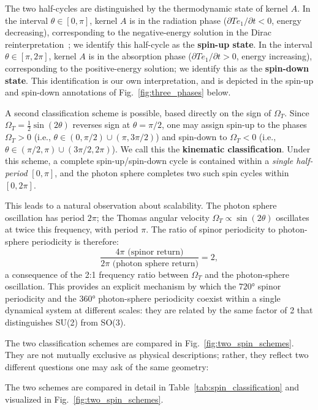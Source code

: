 \documentclass[%
 reprint,
 amsmath,amssymb,
 aps,
 prb,
]{revtex4-2}
\numberwithin{equation}{section}
\theoremstyle{definition}
\theoremstyle{remark}
\begin{document}
The two half-cycles are distinguished by the thermodynamic state of kernel $A$. In the interval $\theta \in [0, \pi]$, kernel $A$ is in the radiation phase ($\partial Te_1/\partial t < 0$, energy decreasing), corresponding to the negative-energy solution in the Dirac reinterpretation~\cite{Hanamura_2018_01}; we identify this half-cycle as the \textbf{spin-up state}. In the interval $\theta \in [\pi, 2\pi]$, kernel $A$ is in the absorption phase ($\partial Te_1/\partial t > 0$, energy increasing), corresponding to the positive-energy solution; we identify this as the \textbf{spin-down state}. This identification is our own interpretation, and is depicted in the spin-up and spin-down annotations of Fig.~\ref{fig:three_phases} below.

A second classification scheme is possible, based directly on the sign of $\Omega_T$. Since $\Omega_T = \tfrac{1}{2}\sin(2\theta)$ reverses sign at $\theta = \pi/2$, one may assign spin-up to the phases $\Omega_T > 0$ (i.e., $\theta \in (0, \pi/2) \cup (\pi, 3\pi/2)$) and spin-down to $\Omega_T < 0$ (i.e., $\theta \in (\pi/2, \pi) \cup (3\pi/2, 2\pi)$). We call this the \textbf{kinematic classification}. Under this scheme, a complete spin-up/spin-down cycle is contained within a \emph{single half-period} $[0, \pi]$, and the photon sphere completes two such spin cycles within $[0, 2\pi]$.

This leads to a natural observation about scalability. The photon sphere oscillation has period $2\pi$; the Thomas angular velocity $\Omega_T \propto \sin(2\theta)$ oscillates at twice this frequency, with period $\pi$. The ratio of spinor periodicity to photon-sphere periodicity is therefore:
\begin{equation}
\frac{4\pi \text{ (spinor return)}}{2\pi \text{ (photon sphere return)}} = 2,
\label{eq:scalability_ratio}
\end{equation}
a consequence of the 2:1 frequency ratio between $\Omega_T$ and the photon-sphere oscillation. This provides an explicit mechanism by which the $720°$ spinor periodicity and the $360°$ photon-sphere periodicity coexist within a single dynamical system at different scales: they are related by the same factor of 2 that distinguishes SU(2) from SO(3).

The two classification schemes are compared in Fig.~\ref{fig:two_spin_schemes}. They are not mutually exclusive as physical descriptions; rather, they reflect two different questions one may ask of the same geometry:

The two schemes are compared in detail in Table~\ref{tab:spin_classification} and visualized in Fig.~\ref{fig:two_spin_schemes}.
\end{document}
